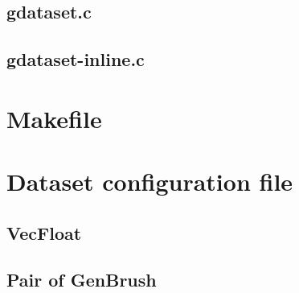 \subsection{gdataset.c}

\begin{scriptsize}
\begin{ttfamily}

\end{ttfamily}
\end{scriptsize}

\subsection{gdataset-inline.c}

\begin{scriptsize}
\begin{ttfamily}

\end{ttfamily}
\end{scriptsize}

\section{Makefile}

\begin{scriptsize}
\begin{ttfamily}

\end{ttfamily}
\end{scriptsize}

\section{Dataset configuration file}

\subsection{VecFloat}

\begin{scriptsize}
\begin{ttfamily}

\end{ttfamily}
\end{scriptsize}

\subsection{Pair of GenBrush}

